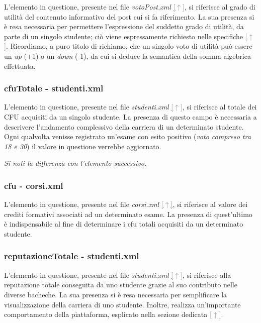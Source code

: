 \documentclass [a4paper,11pt]{book}
\begin{document}
L'elemento in questione, presente nel file \emph{votoPost.xml} \hyperref[sec:votoPost]{\textcolor{gray}{[$\uparrow$]}}, si riferisce al grado di utilità del contenuto informativo del post cui si fa riferimento. La sua presenza si è resa necessaria per permettere l'espressione del suddetto grado di utilità, da parte di un singolo studente; ciò viene espressamente richiesto nelle specifiche \hyperref[sec:specifiche]{\textcolor{gray}{[$\uparrow$]}}. Ricordiamo, a puro titolo di richiamo, che un singolo voto di utilità può essere un \emph{up} (+1) o un \emph{down} (-1), da cui si deduce la semantica della somma algebrica effettuata.

\medskip

\subsubsection{cfuTotale - studenti.xml}

L'elemento in questione, presente nel file \emph{studenti.xml} \hyperref[sec:studenti]{\textcolor{gray}{[$\uparrow$]}}, si riferisce al totale dei CFU acquisiti da un singolo studente. La presenza di questo campo è necessaria a descrivere l'andamento complessivo della carriera di un determinato studente. Ogni qualvolta venisse registrato un'esame con esito positivo (\emph{voto compreso tra 18 e 30}) il valore in questione verrebbe aggiornato.

\medskip

\emph{Si noti la differenza con l'elemento successivo.}

\medskip

\subsubsection{cfu - corsi.xml}

L'elemento in questione, presente nel file \emph{corsi.xml} \hyperref[sec:corsi]{\textcolor{gray}{[$\uparrow$]}}, si riferisce al valore dei crediti formativi associati ad un determinato esame. La presenza di quest'ultimo è indispensabile al fine di determinare i cfu totali acquisiti da un determinato studente.

\medskip

\subsubsection{reputazioneTotale - studenti.xml}

L'elemento in questione, presente nel file \emph{studenti.xml} \hyperref[sec:studenti]{\textcolor{gray}{[$\uparrow$]}}, si riferisce alla reputazione totale conseguita da uno studente grazie al suo contributo nelle diverse bacheche. La sua presenza si è resa necessaria per semplificare la visualizzazione della carriera di uno studente. Inoltre, realizza un'importante comportamento della piattaforma, esplicato nella sezione dedicata \hyperref[sec:bacheca]{\textcolor{gray}{[$\uparrow$]}}.
\end{document}
